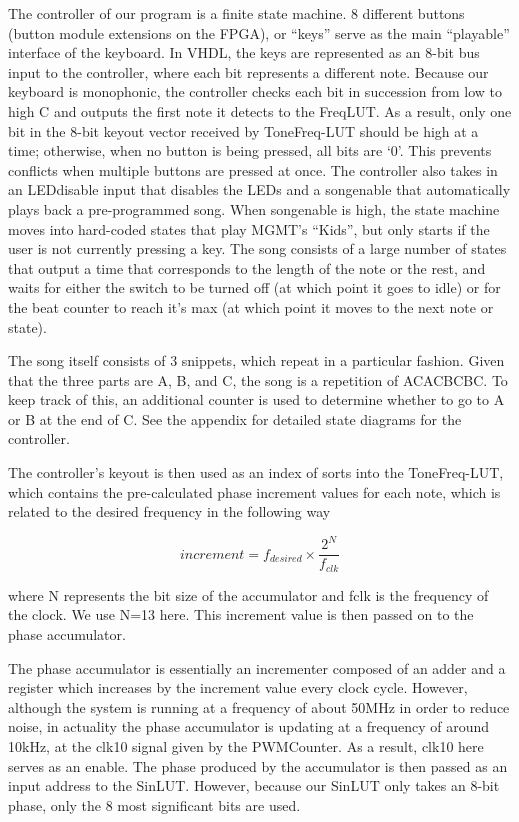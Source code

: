 \documentclass{article}
\begin{document}
    The controller of our program is a finite state machine. 8 different buttons (button module extensions on the FPGA), or ``keys'' serve as the main ``playable'' interface of the keyboard. In VHDL, the keys are represented as an 8-bit bus input to the controller, where each bit represents a different note. Because our keyboard is monophonic, the controller checks each bit in succession from low to high C and outputs the first note it detects to the FreqLUT. As a result, only one bit in the 8-bit key\textunderscore out vector received by ToneFreq-LUT should be high at a time; otherwise, when no button is being pressed, all bits are `0'. This prevents conflicts when multiple buttons are pressed at once. The controller also takes in an LED\textunderscore disable input that disables the LEDs and a song\textunderscore enable that automatically plays back a pre-programmed song. When song\textunderscore enable is high, the state machine moves into hard-coded states that play MGMT's ``Kids'', but only starts if the user is not currently pressing a key. The song consists of a large number of states that output a time that corresponds to the length of the note or the rest, and waits for either the switch to be turned off (at which point it goes to idle) or for the beat counter to reach it's max (at which point it moves to the next note or state).

    The song itself consists of 3 snippets, which repeat in a particular fashion. Given that the three parts are A, B, and C, the song is a repetition of ACACBCBC. To keep track of this, an additional counter is used to determine whether to go to A or B at the end of C. See the appendix for detailed state diagrams for the controller.

    The controller's key\textunderscore out is then used as an index of sorts into the ToneFreq-LUT, which contains the pre-calculated phase increment values for each note, which is related to the desired frequency in the following way

    \[increment = f_{desired} \times \frac{2^N}{f_{clk}}\]

    where N represents the bit size of the accumulator and fclk is the frequency of the clock. We use N=13 here. This increment value is then passed on to the phase accumulator.

    The phase accumulator is essentially an incrementer composed of an adder and a register which increases by the increment value every clock cycle. However, although the system is running at a frequency of about 50MHz in order to reduce noise, in actuality the phase accumulator is updating at a frequency of around 10kHz, at the clk10 signal given by the PWMCounter. As a result, clk10 here serves as an enable. The phase produced by the accumulator is then passed as an input address to the SinLUT. However, because our SinLUT only takes an 8-bit phase, only the 8 most significant bits are used.
\end{document}
